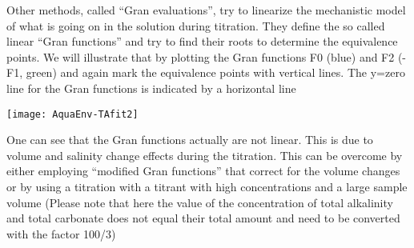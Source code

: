 \documentclass[article,nojss]{jss}
\begin{document}
\noindent
Other methods, called ``Gran evaluations''\citep{Gran1952, Hansson1973, Dickson1981, Haraldsson1997, Anderson1999},
try to linearize the mechanistic model of what is going on in the solution during titration. 
They define the so called linear ``Gran functions''  and try to find their roots to determine the equivalence points.
We will illustrate that by plotting the Gran functions  F0 (blue) and F2 (-F1, green)  and again mark the equivalence points with vertical lines.
The y=zero line for the Gran functions is indicated by a horizontal line

\begin{Schunk}
\end{Schunk}
\texttt{[image: AquaEnv-TAfit2]}

One can see that the Gran functions actually are not linear. This is due to volume and salinity change effects during the titration.
This can be overcome by either employing ``modified Gran functions'' \citep[see][]{Haraldsson1997} that correct for the volume changes or by using 
a titration with a titrant with high concentrations and a large sample volume (Please note that here the value of the concentration of total
alkalinity and total carbonate does not equal their total amount and need to be converted with the factor 100/3)
\end{document}
